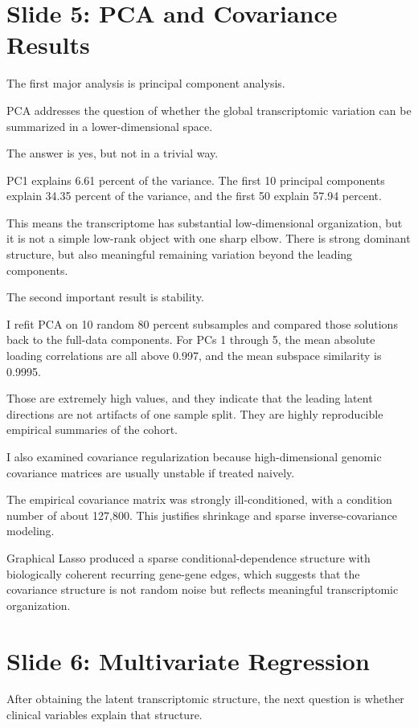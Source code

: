 \documentclass[12pt]{article}
\begin{document}
\section{Slide 5: PCA and Covariance Results}
The first major analysis is principal component analysis.

PCA addresses the question of whether the global transcriptomic variation can be summarized in a lower-dimensional space.

The answer is yes, but not in a trivial way.

PC1 explains 6.61 percent of the variance. The first 10 principal components explain 34.35 percent of the variance, and the first 50 explain 57.94 percent.

This means the transcriptome has substantial low-dimensional organization, but it is not a simple low-rank object with one sharp elbow. There is strong dominant structure, but also meaningful remaining variation beyond the leading components.

The second important result is stability.

I refit PCA on 10 random 80 percent subsamples and compared those solutions back to the full-data components. For PCs 1 through 5, the mean absolute loading correlations are all above 0.997, and the mean subspace similarity is 0.9995.

Those are extremely high values, and they indicate that the leading latent directions are not artifacts of one sample split. They are highly reproducible empirical summaries of the cohort.

I also examined covariance regularization because high-dimensional genomic covariance matrices are usually unstable if treated naively.

The empirical covariance matrix was strongly ill-conditioned, with a condition number of about 127,800. This justifies shrinkage and sparse inverse-covariance modeling.

Graphical Lasso produced a sparse conditional-dependence structure with biologically coherent recurring gene-gene edges, which suggests that the covariance structure is not random noise but reflects meaningful transcriptomic organization.

\section{Slide 6: Multivariate Regression}
After obtaining the latent transcriptomic structure, the next question is whether clinical variables explain that structure.
\end{document}
